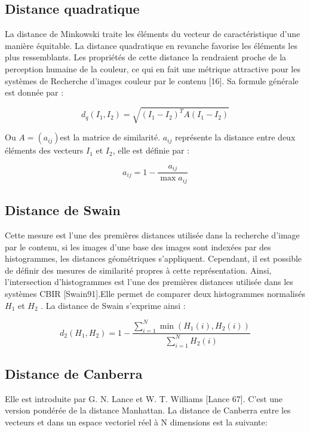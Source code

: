 \subsection{Distance quadratique}
La distance de Minkowski traite les éléments du vecteur de
caractéristique d’une manière équitable. La distance quadratique en revanche favorise les éléments les plus ressemblants. Les propriétés de cette distance la rendraient proche de la perception humaine de la couleur, ce qui en fait une métrique attractive pour les systèmes de Recherche d’images couleur par le contenu [16]. Sa formule générale est donnée par :

	\begin{equation}
	d_q(I_1, I_2) = \sqrt{(I_1 - I_2)^T A (I_1 - I_2)} 
	\end{equation}



Ou $A = (a_{ij}) $est la matrice de similarité. $a_{ij}$ représente la distance entre deux éléments des vecteurs $I_1$ et $I_2$, elle est définie par :


	\begin{equation}
	 a_{ij} = 1 - \frac{a_{ij}}{\max a_{ij}} 
	\end{equation}


\subsection{Distance de Swain}
Cette mesure est l'une des premières distances utilisée dans la recherche d'image par le contenu, si les images d’une base des images sont indexées par des histogrammes, les distances géométriques s’appliquent. Cependant, il est possible de définir des mesures de similarité propres à cette représentation. Ainsi, l’intersection d’histogrammes est l’une des premières distances utilisée dans les systèmes CBIR [Swain91].Elle permet de comparer deux histogrammes normalisés $H_1$ et $H_2$ . La distance de Swain s’exprime ainsi :

	\begin{equation}
	 d_2(H_1, H_2) = 1- \frac{\sum_{i=1}^{N} \min(H_1(i),  H_2(i))}{\sum_{i=1}^{N}  H_2(i)}  
	\end{equation}

\subsection{Distance de Canberra}
Elle est introduite par G. N. Lance et W. T. Williams [Lance 67]. C'est une version
pondérée de la distance Manhattan. La distance de Canberra entre les vecteurs et dans un espace vectoriel réel à N dimensions est la suivante:

